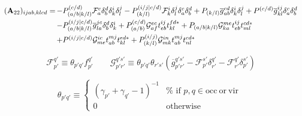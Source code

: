 \begin{subappendices}
    \begin{equation}
        \label{eq:a22-odc12-formula}
        \begin{array}{r@{\,}l}
            (\mathbf{A}_{22})_{ijab,klcd}
            =
            &
            -
            P_{(a/b|k/l)}^{(c/d)}
            \mathcal{F}_a^c
            \delta_b^d
            \delta_k^i
            \delta_l^j
            -
            P_{(k/l)}^{(i/j|c/d)}
            \mathcal{F}_k^i
            \delta_l^j
            \delta_a^c
            \delta_b^d
            +
            P_{(k/l)}
            \overline{g}_{ab}^{cd}
            \delta_k^i
            \delta_l^j
            +
            P^{(c/d)}
            \overline{g}_{kl}^{ij}
            \delta_a^c
            \delta_b^d
            \\[5pt]
            &
            -
            P_{(a/b|k/l)}^{(i/j|c/d)}
            \overline{g}_{la}^{jc}
            \delta_b^d
            \delta_k^i
            +
            P_{(a/b)}^{(c/d)}
            \mathcal{G}_{af}^{ec}
            t_{eb}^{ij}
            t_{kl}^{fd*}
            +
            P_{(a/b|k/l)}
            \mathcal{G}_{ka}^{me}
            t_{eb}^{ij}
            t_{ml}^{cd*}
            \\[5pt]
            &
            +
            P^{(i/j|c/d)}
            \mathcal{G}_{me}^{ic}
            t_{ab}^{mj}
            t_{kl}^{ed*}
            +
            P_{(k/l)}^{(i/j)}
            \mathcal{G}_{mk}^{in}
            t_{ab}^{mj}
            t_{nl}^{cd*}
        \end{array}
    \end{equation}

    \begin{equation}
        \mathcal{F}_{p'}^{q'}
        \equiv
        \theta_{p'q'}
        f_{p'}^{q'}
        \qquad
        \mathcal{G}_{p'r'}^{q's'}
        \equiv
        \theta_{p'q'}
        \theta_{r's'}
        (
            \overline{g}_{p'r'}^{q's'}
            -
            \mathcal{F}_{p'}^{s'}
            \delta_{r'}^{q'}
            -
            \mathcal{F}_{r'}^{q'}
            \delta_{p'}^{s'}
        )
    \end{equation}

    \begin{equation}
        \theta_{p'q'}
        \equiv
        \left\{
            \begin{array}{cc}
                (
                    \gamma_{p'}
                    +
                    \gamma_{q'}
                    -
                    1
                )^{-1}
                &
                \text{%
                    if
                    \(p,q\in \mathrm{occ \ or \ vir}\)
                }
                \\
                0
                &
                \text{otherwise}
            \end{array}
        \right.
    \end{equation}


\end{subappendices}
